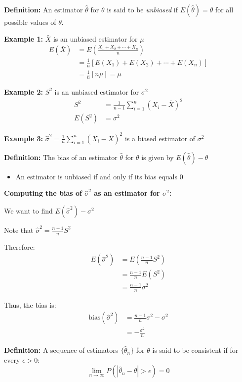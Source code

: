 \documentclass{article}
\begin{document}
    \textbf{Definition:} An estimator $\hat{\theta}$ for $\theta$ is said to be \emph{unbiased} if $E(\hat{\theta}) = \theta$ for all possible values of $\theta$.

    \textbf{Example 1:} $\bar{X}$ is an unbiased estimator for $\mu$
    \begin{align*}
        E(\bar{X}) &= E\left(\frac{X_1 + X_2 + \cdots + X_n}{n}\right) \\
        &= \frac{1}{n}[E(X_1) + E(X_2) + \cdots + E(X_n)] \\
        &= \frac{1}{n}[n\mu] = \mu
    \end{align*}

    \textbf{Example 2:} $S^2$ is an unbiased estimator for $\sigma^2$
    \begin{align*}
        S^2 &= \frac{1}{n-1}\sum_{i=1}^n (X_i - \bar{X})^2 \\
        E(S^2) &= \sigma^2
    \end{align*}

   \textbf{Example 3:} $\hat{\sigma}^2 = \frac{1}{n} \sum_{i=1}^n (X_i - \bar{X})^2$ is a biased estimator of $\sigma^2$

   \textbf{Definition:} The bias of an estimator $\hat{\theta}$ for $\theta$ is given by $E(\hat{\theta}) - \theta$
   \begin{itemize}
       \item An estimator is unbiased if and only if its bias equals 0
   \end{itemize}

   \textbf{Computing the bias of $\hat{\sigma}^2$ as an estimator for $\sigma^2$:}
   
   We want to find $E(\hat{\sigma}^2) - \sigma^2$

   Note that $\hat{\sigma}^2 = \frac{n-1}{n}S^2$

   Therefore:
   \begin{align*}
       E(\hat{\sigma}^2) &= E\left(\frac{n-1}{n}S^2\right) \\
       &= \frac{n-1}{n} E(S^2) \\
       &= \frac{n-1}{n} \sigma^2
   \end{align*}

   Thus, the bias is:
   \begin{align*}
       \text{bias}(\hat{\sigma}^2) &= \frac{n-1}{n}\sigma^2 - \sigma^2 \\
       &= -\frac{\sigma^2}{n}
   \end{align*}

   \textbf{Definition:} A sequence of estimators $\{\hat{\theta}_n\}$ for $\theta$ is said to be consistent if for every $\epsilon > 0$:
   \[\lim_{n \to \infty} P(|\hat{\theta}_n - \theta| > \epsilon) = 0\]
\end{document}
